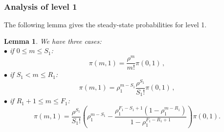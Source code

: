 \documentclass[conference]{IEEEtran}
\newtheorem{lem}{Lemma}
\begin{document}
\subsubsection{Analysis of level 1}
The following lemma gives the steady-state probabilities for level 1.
\begin{lem}
We have three cases:\\
$\bullet$ if $0\leq m \leq S_1$:
\begin{equation}
 \pi(m,1)=\frac{\rho^{m}}{m!} \pi(0,1) \, ,
\label{eq1a}
 \end{equation}
$\bullet$ if $S_1<  m \leq R_1$:
\begin{equation}
 \pi(m,1)=\rho_1^{m-S_1} \frac{\rho^{S_1}}{S_1!}\pi(0,1) \, ,
 \label{eq1b}
 \end{equation}
$\bullet$ if $R_1+1 \leq m \leq  F_1$:
\begin{equation}
\pi(m,1)= \frac{\rho^{S_1}}{S_1!}(\rho_1^{m-S_1}- \frac{ \rho_1^{F_1-S_1+1} (1-\rho_1^{m-R_1})} {1-\rho_1^{F_1-R_1+1}}) \pi(0,1).
\label{eq1c}
\end{equation}
\end{lem}
\end{document}
